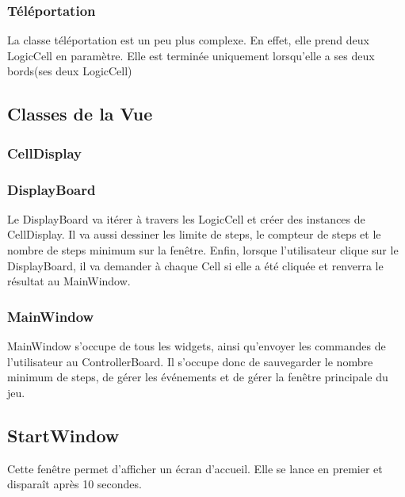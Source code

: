 \documentclass[utf8]{article}
\begin{document}
\begin{large}
\subsubsection{Téléportation}
\par
\indent
La classe téléportation est un peu plus complexe. En effet, elle prend deux
LogicCell en paramètre. Elle est terminée uniquement lorsqu'elle a ses deux bords(ses deux LogicCell)
\par

\subsection{Classes de la Vue}
\subsubsection{CellDisplay}
\par
\indent

\par
\subsubsection{DisplayBoard}
\par
\indent
Le DisplayBoard va itérer à travers les LogicCell et créer des instances de
CellDisplay. Il va aussi dessiner les limite de steps, le compteur de steps et le
nombre de steps minimum sur la fenêtre. Enfin, lorsque l'utilisateur clique sur le
DisplayBoard, il va demander à chaque Cell si elle a été cliquée et renverra le
résultat au MainWindow.
\par
\subsubsection{MainWindow}
\par
\indent
MainWindow s'occupe de tous les widgets, ainsi qu'envoyer les commandes de
l'utilisateur au ControllerBoard. Il s'occupe donc de sauvegarder le nombre
minimum de steps, de gérer les événements et de gérer la fenêtre principale du
jeu.
\par
\subsection{StartWindow}
\par
\indent
Cette fenêtre permet d'afficher un écran d'accueil. Elle se lance en premier et
disparaît après 10 secondes.
\par



\end{large}
\end{document}
